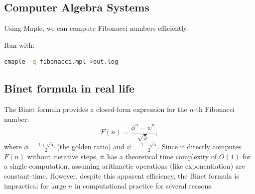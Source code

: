 \documentclass{article}
\begin{document}
\subsection{Computer Algebra Systems}
Using Maple, we can compute Fibonacci numbers efficiently:

Run with:
\begin{lstlisting}[language=bash]
cmaple -q fibonacci.mpl >out.log
\end{lstlisting}

\subsection{Binet formula in real life}

The Binet formula provides a closed-form expression for the \(n\)-th Fibonacci number:
\[
F(n) = \frac{\phi^n - \psi^n}{\sqrt{5}},
\]
where \(\phi = \frac{1 + \sqrt{5}}{2}\) (the golden ratio) and \(\psi = \frac{1 - \sqrt{5}}{2}\). Since it directly computes \(F(n)\) without iterative steps, it has a theoretical time complexity of \(O(1)\) for a single computation, assuming arithmetic operations (like exponentiation) are constant-time. However, despite this apparent efficiency, the Binet formula is impractical for large \(n\) in computational practice for several reasons.
\end{document}

